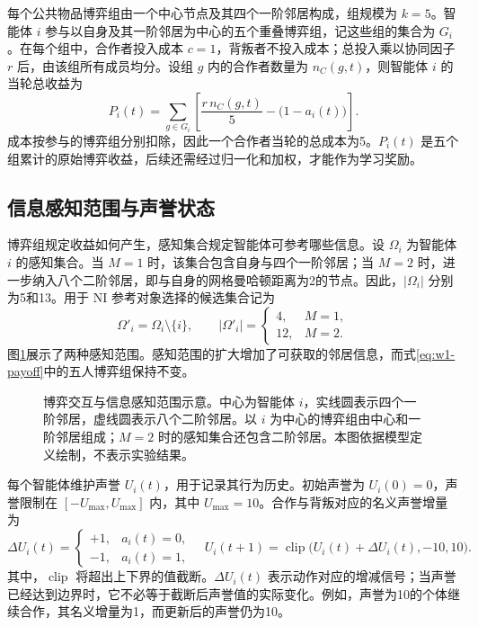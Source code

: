 每个公共物品博弈组由一个中心节点及其四个一阶邻居构成，组规模为 $k=5$。智能体 $i$ 参与以自身及其一阶邻居为中心的五个重叠博弈组，记这些组的集合为 $G_i$。在每个组中，合作者投入成本 $c=1$，背叛者不投入成本；总投入乘以协同因子 $r$ 后，由该组所有成员均分。设组 $g$ 内的合作者数量为 $n_C(g,t)$，则智能体 $i$ 的当轮总收益为
\begin{equation}
 P_i(t)=\sum_{g\in G_i}\left[\frac{r\,n_C(g,t)}{5}-\bigl(1-a_i(t)\bigr)\right].
 \label{eq:w1-payoff}
\end{equation}
成本按参与的博弈组分别扣除，因此一个合作者当轮的总成本为5。$P_i(t)$ 是五个组累计的原始博弈收益，后续还需经过归一化和加权，才能作为学习奖励。

\subsection{信息感知范围与声誉状态}

博弈组规定收益如何产生，感知集合规定智能体可参考哪些信息。设 $\Omega_i$ 为智能体 $i$ 的感知集合。当 $M=1$ 时，该集合包含自身与四个一阶邻居；当 $M=2$ 时，进一步纳入八个二阶邻居，即与自身的网格曼哈顿距离为2的节点。因此，$|\Omega_i|$ 分别为5和13。用于 NI 参考对象选择的候选集合记为
\begin{equation}
 \Omega'_i=\Omega_i\setminus\{i\},\qquad
 |\Omega'_i|=\begin{cases}4,&M=1,\\12,&M=2.\end{cases}
 \label{eq:w1-neighborhood}
\end{equation}
图\ref{fig:w1-neighborhood}展示了两种感知范围。感知范围的扩大增加了可获取的邻居信息，而式\eqref{eq:w1-payoff}中的五人博弈组保持不变。

\begin{figure}[htbp]
 \centering
 
 \caption{博弈交互与信息感知范围示意。中心为智能体 $i$，实线圆表示四个一阶邻居，虚线圆表示八个二阶邻居。以 $i$ 为中心的博弈组由中心和一阶邻居组成；$M=2$ 时的感知集合还包含二阶邻居。本图依据模型定义绘制，不表示实验结果。}
 \label{fig:w1-neighborhood}
\par{}
\end{figure}

每个智能体维护声誉 $U_i(t)$，用于记录其行为历史。初始声誉为 $U_i(0)=0$，声誉限制在 $[-U_{\max},U_{\max}]$ 内，其中 $U_{\max}=10$。合作与背叛对应的名义声誉增量为
\begin{equation}
 \Delta U_i(t)=\begin{cases}+1,&a_i(t)=0,\\-1,&a_i(t)=1,\end{cases}
 \quad
 U_i(t+1)=\operatorname{clip}\bigl(U_i(t)+\Delta U_i(t),-10,10\bigr).
 \label{eq:w1-reputation}
\end{equation}
其中，$\operatorname{clip}$ 将超出上下界的值截断。$\Delta U_i(t)$ 表示动作对应的增减信号；当声誉已经达到边界时，它不必等于截断后声誉值的实际变化。例如，声誉为10的个体继续合作，其名义增量为1，而更新后的声誉仍为10。

